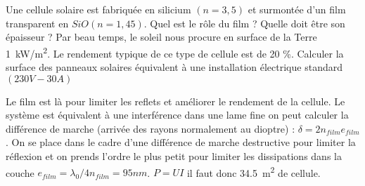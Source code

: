 \begin{Exercise}[title=Enduit pour cellules solaires]
  Une cellule solaire est fabriquée en silicium $(n=3,5)$ et surmontée d'un film
  transparent en $SiO(n=1,45)$. Quel est le rôle du film ? Quelle doit être son
  épaisseur ? Par beau temps, le soleil nous procure en surface de la Terre
  \SI{1}{kW/m^2}. Le rendement typique de ce type de cellule est de 20 \%. Calculer la
  surface des panneaux solaires équivalent à une installation électrique
  standard $(230V - 30A)$
\end{Exercise}
\begin{Answer}
  Le film est là pour limiter les reflets et améliorer le rendement de la cellule.
  Le système est équivalent à une interférence dans une lame fine on peut calculer
  la différence de marche (arrivée des rayons normalement au dioptre) : $\delta = 2n_{film}e_{film}$ . On se place dans le cadre d'une différence de marche destructive
  pour limiter la réflexion et on prends l'ordre le plus petit pour limiter les
  dissipations dans la couche $e_{film} = \lambda_0/4n_{film} = 95 nm$.
  $P = UI$ il faut donc \SI{34,5}{\m^2} de cellule.
\end{Answer}
